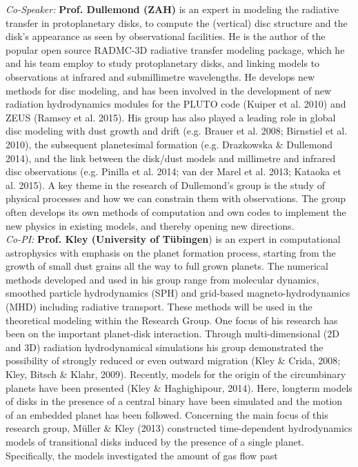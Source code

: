 \documentclass[12pt]{article}
\begin{document}
{\it Co-Speaker:} {\bf Prof. Dullemond (ZAH)} is an expert in modeling the radiative transfer in protoplanetary
disks, to compute the (vertical) disc structure and the disk's appearance as seen
by observational facilities. He is the author of the popular open source RADMC-3D 
radiative transfer modeling package, which he and his team employ to study
protoplanetary disks, and linking models to observations at infrared and submillimetre
wavelengths. He develops new methods for disc modeling, and has been involved
in the development of new radiation hydrodynamics modules for the PLUTO code
(Kuiper et al. 2010) and ZEUS (Ramsey et al. 2015). His group has also played a
leading role in global disc modeling with dust growth and drift (e.g. Brauer et al. 2008;
Birnstiel et al. 2010), the subsequent planetesimal formation (e.g. Drazkowska 
\& Dullemond 2014), and the link between the disk/dust models and millimetre
and infrared disc observations (e.g. Pinilla et al. 2014; van der Marel et al. 2013;
Kataoka et al. 2015). A key theme in the research of Dullemond's group is the study 
of physical processes and how we can constrain them with observations. The
group often develops its own methods of computation and own codes to implement
the new physics in existing models, and thereby opening new
directions. \\
{\it Co-PI:} {\bf Prof. Kley (University of T\"ubingen}) is an expert in computational astrophysics with emphasis on the
planet formation process, starting from the growth of small dust grains all the way
to full grown planets. The numerical methods developed and used in his group range 
from molecular dynamics, smoothed particle hydrodynamics (SPH) and grid-based 
magneto-hydrodynamics (MHD) including radiative transport. These methods will be used
in the theoretical modeling within the Research Group.   
One focus of his research has been on the important planet-disk
interaction. Through multi-dimensional (2D and 3D) radiation hydrodynamical simulations
his group demonstrated the possibility of strongly reduced or even outward migration
(Kley \& Crida, 2008; Kley, Bitsch \& Klahr, 2009). Recently, models for the origin of the
circumbinary planets have been presented (Kley \& Haghighipour, 2014). Here, longterm models of
disks in the presence of a central binary have been simulated and the motion of an embedded
planet has been followed. Concerning the main focus of this research group, M\"uller \& Kley
(2013) constructed time-dependent hydrodynamics models of transitional disks induced by the
presence of a single planet. Specifically, the models investigated the amount of gas flow past
\end{document}
